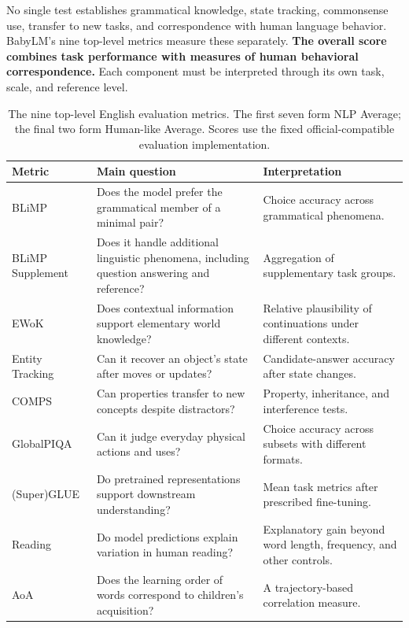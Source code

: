 No single test establishes grammatical knowledge, state tracking, commonsense use, transfer to new tasks, and correspondence with human language behavior. BabyLM's nine top-level metrics measure these separately. \textbf{The overall score combines task performance with measures of human behavioral correspondence.} Each component must be interpreted through its own task, scale, and reference level.

\begin{table}[htbp]
\caption{The nine top-level English evaluation metrics. The first seven form NLP Average; the final two form Human-like Average. Scores use the fixed official-compatible evaluation implementation.}
\label{tab:metrics}
\small
\begin{tabularx}{\linewidth}{@{}P{29mm}Y Y@{}}
\toprule Metric & Main question & Interpretation\\\midrule
BLiMP & Does the model prefer the grammatical member of a minimal pair? & Choice accuracy across grammatical phenomena.\\
BLiMP Supplement & Does it handle additional linguistic phenomena, including question answering and reference? & Aggregation of supplementary task groups.\\
EWoK & Does contextual information support elementary world knowledge? & Relative plausibility of continuations under different contexts.\\
Entity Tracking & Can it recover an object's state after moves or updates? & Candidate-answer accuracy after state changes.\\
COMPS & Can properties transfer to new concepts despite distractors? & Property, inheritance, and interference tests.\\
GlobalPIQA & Can it judge everyday physical actions and uses? & Choice accuracy across subsets with different formats.\\
(Super)GLUE & Do pretrained representations support downstream understanding? & Mean task metrics after prescribed fine-tuning.\\
Reading & Do model predictions explain variation in human reading? & Explanatory gain beyond word length, frequency, and other controls.\\
AoA & Does the learning order of words correspond to children's acquisition? & A trajectory-based correlation measure.\\
\bottomrule
\end{tabularx}
\end{table}


